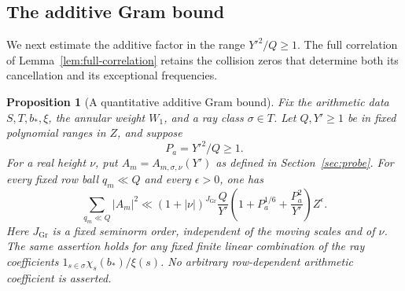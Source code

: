 \documentclass[11pt,a4paper]{article}
\numberwithin{equation}{section}
\numberwithin{figure}{section}
\newtheorem{proposition}[theorem]{Proposition}
\theoremstyle{definition}
\theoremstyle{remark}
\begin{document}
\subsection{The additive Gram bound}

We next estimate the additive factor in the range $Y'^2/Q\ge1$.  The
full correlation of Lemma~\ref{lem:full-correlation} retains the collision
zeros that determine both its cancellation and its exceptional frequencies.

\begin{proposition}[A quantitative additive Gram bound]\label{prop:probe-gram}
Fix the arithmetic data $S,T,b_*,\xi$, the annular weight $W_1$,
and a ray class $\sigma\in T$.  Let $Q,Y'\ge1$ be in fixed
polynomial ranges in $Z$, and suppose
\[
 P_a=Y'^2/Q\ge1.
\]
For a real height $\nu$, put $A_m=A_{m,\sigma,\nu}(Y')$ as defined in
Section~\ref{sec:probe}.  For every fixed row ball $q_m\ll Q$ and every
$\epsilon>0$, one has
\begin{equation}
 \sum_{q_m\ll Q}|A_m|^2
 \ll (1+|\nu|)^{J_{\mathrm{Gr}}}\frac Q{Y'}
       \left(1+P_a^{1/6}+\frac{P_a^2}{Y'}\right)Z^\epsilon.
 \label{eq:gram-quantitative}
\end{equation}
Here $J_{\mathrm{Gr}}$ is a fixed seminorm order, independent of the moving
scales and of $\nu$.  The same assertion holds for any fixed finite
linear combination of the ray coefficients
$1_{s\in\sigma}\chi_s(b_*)/\xi(s)$.  No arbitrary
row-dependent arithmetic coefficient is asserted.
\end{proposition}
\end{document}
